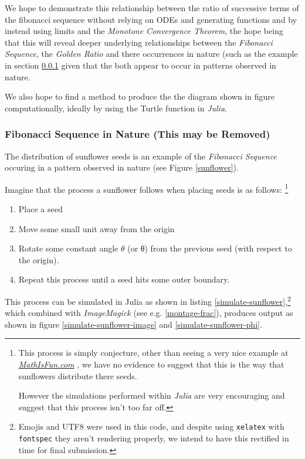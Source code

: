 \documentclass[11pt]{article}
\begin{document}
We hope to demonstrate this relationship between the ratio of successive terms
of the fibonacci sequence without relying on ODEs and generating functions and
by instead using limits and the \emph{Monotone Convergence Theorem}, the hope being
that this will reveal deeper underlying relationships between the \emph{Fibonacci
Sequence}, the \emph{Golden Ratio} and there occurrences in nature (such as the
example in section \ref{sunflower-example} given that the both appear to occur in
patterns observed in nature.

We also hope to find a method to produce the the diagram shown in figure
computationally, ideally by using the Turtle function in \emph{Julia}.

\subsubsection{Fibonacci Sequence in Nature (This may be Removed)}
\label{sunflower-example}
The distribution of sunflower seeds is an example of the \emph{Fibonacci Sequence}
occuring in a pattern observed in nature (see Figure \ref{sunflower}).

Imagine that the process a sunflower follows when placing seeds is as follows: \footnote{This process is simply conjecture, other than seeing a very nice example at \href{https://www.mathsisfun.com/numbers/nature-golden-ratio-fibonacci.html}{\emph{MathIsFun.com}}
\cite{NatureGoldenRatio2018}, we have no evidence to suggest that this is the way
that sunflowers distribute there seeds.

However the simulations performed within \emph{Julia} are very encouraging and
suggest that this process isn't too far off.}

\begin{enumerate}
\item Place a seed
\item Move some small unit away from the origin
\item Rotate some constant angle \(\mathtt{\theta}\) (or θ) from the previous seed (with respect to the origin).
\item Repeat this process until a seed hits some outer boundary.
\end{enumerate}

This process can be simulated in Julia \cite{bezansonJuliaFreshApproach2017} as shown in listing \ref{simulate-sunflower},\footnote{Emojis and UTF8 were used in this code, and despite using \texttt{xelatex} with \texttt{fontspec} they aren't rendering properly, we intend to have this rectified in time for final submission.} which combined with \emph{ImageMagick} (see e.g. \ref{montage-frac}), produces output as shown in figure \ref{simulate-sunflower-image} and \ref{simulate-sunflower-phi}.
\end{document}
